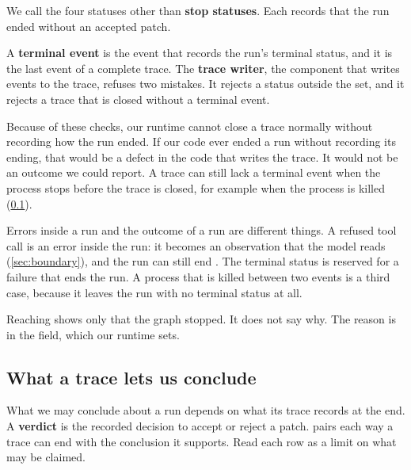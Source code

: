 We call the four statuses other than  \textbf{stop statuses}. Each records that
the run ended without an accepted patch.

A \textbf{terminal event} is the event that records the run's terminal status, and it is the last
event of a complete trace. The \textbf{trace writer}, the component that writes events to the
trace, refuses two mistakes. It rejects a status outside the set, and it rejects a trace that is
closed without a terminal event.

Because of these checks, our runtime cannot close a trace normally without recording how the run
ended. If our code ever ended a run without recording its ending, that would be a defect in the
code that writes the trace. It would not be an outcome we could report. A trace can still lack a
terminal event when the process stops before the trace is closed, for example when the process is
killed (\cref{sec:control-conclude}).

Errors inside a run and the outcome of a run are different things. A refused tool call is an error
inside the run: it becomes an observation that the model reads (\cref{sec:boundary}), and the run
can still end . The terminal status  is reserved for a failure that
ends the run. A process that is killed between two events is a third case, because it leaves the
run with no terminal status at all.

Reaching  shows only that the graph stopped. It does not say why. The reason is in the
 field, which our runtime sets.

\subsection{What a trace lets us conclude}
\label{sec:control-conclude}

What we may conclude about a run depends on what its trace records at the end. A
\textbf{verdict} is the recorded decision to accept or reject a patch. 
pairs each way a trace can end with the conclusion it supports. Read each row as a limit on what may
be claimed.

